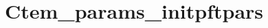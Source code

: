 \hypertarget{group__ctem__params__initpftpars}{}\section{Ctem\+\_\+params\+\_\+initpftpars}
\label{group__ctem__params__initpftpars}
